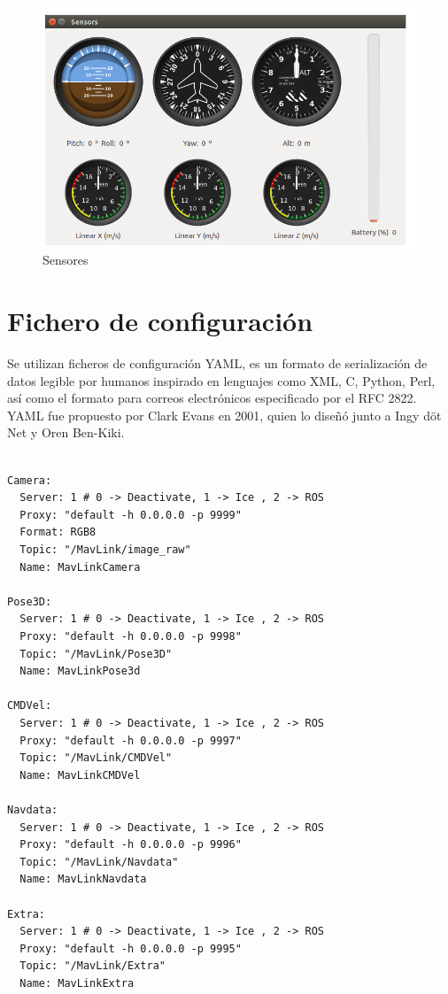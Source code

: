 \begin{figure}[H]
  \centering
  \includegraphics[scale=0.4]{imagenes/sensores.png}
  \caption{Sensores}
  \label{fig:sensores}
\end{figure}

\section{Fichero de configuración}

Se utilizan ficheros de configuración YAML, es un formato de serialización de datos legible por humanos inspirado en lenguajes como XML, C, Python, Perl, así como el formato para correos electrónicos especificado por el RFC 2822. YAML fue propuesto por Clark Evans en 2001, quien lo diseñó junto a Ingy döt Net y Oren Ben-Kiki.


{\scriptsize
\begin{verbatim}

Camera:
  Server: 1 # 0 -> Deactivate, 1 -> Ice , 2 -> ROS
  Proxy: "default -h 0.0.0.0 -p 9999"
  Format: RGB8
  Topic: "/MavLink/image_raw"
  Name: MavLinkCamera

Pose3D:
  Server: 1 # 0 -> Deactivate, 1 -> Ice , 2 -> ROS
  Proxy: "default -h 0.0.0.0 -p 9998"
  Topic: "/MavLink/Pose3D"
  Name: MavLinkPose3d

CMDVel:
  Server: 1 # 0 -> Deactivate, 1 -> Ice , 2 -> ROS
  Proxy: "default -h 0.0.0.0 -p 9997"
  Topic: "/MavLink/CMDVel"
  Name: MavLinkCMDVel

Navdata:
  Server: 1 # 0 -> Deactivate, 1 -> Ice , 2 -> ROS
  Proxy: "default -h 0.0.0.0 -p 9996"
  Topic: "/MavLink/Navdata"
  Name: MavLinkNavdata

Extra:
  Server: 1 # 0 -> Deactivate, 1 -> Ice , 2 -> ROS
  Proxy: "default -h 0.0.0.0 -p 9995"
  Topic: "/MavLink/Extra"
  Name: MavLinkExtra
\end{verbatim}}

